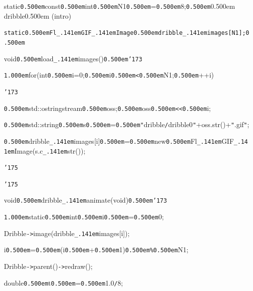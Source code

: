 \documentclass[12pt]{article}
\begin{document}
\noindent
{}static{\tt\mc \kern0.500em}const{\tt\mc \kern0.500em}int{\tt\mc \kern0.500em}N1{\tt\mc \kern0.500em}={\tt\mc \kern0.500em}8;{\tt\mc \kern0.500em}\rm\mc {\tt /}{\tt /}\kern0.500em dribble\kern0.500em (intro)

\noindent
\tt\mc static{\tt\mc \kern0.500em}Fl{\tt\_\kern.141em}GIF{\tt\_\kern.141em}Image{\tt *}{\tt\mc \kern0.500em}dribble{\tt\_\kern.141em}images[N1];{\tt\mc \kern0.500em}

\noindent
{}\hfill

\noindent
{}void{\tt\mc \kern0.500em}load{\tt\_\kern.141em}images(){\tt\mc \kern0.500em}{\tt\char'173}

\noindent
{}{\tt\mc \kern1.000em}for(int{\tt\mc \kern0.500em}i=0;{\tt\mc \kern0.500em}i{\tt\mc \kern0.500em}{\tt <}{\tt\mc \kern0.500em}N1;{\tt\mc \kern0.500em}++i)

\noindent
{}{\tt\char'173}

\noindent
{}{\tt\mc \kern0.500em}std::ostringstream{\tt\mc \kern0.500em}oss;{\tt\mc \kern0.500em}oss{\tt\mc \kern0.500em}{\tt <}{\tt <}{\tt\mc \kern0.500em}i;

\noindent
{}{\tt\mc \kern0.500em}std::string{\tt\mc \kern0.500em}s{\tt\mc \kern0.500em}={\tt\mc \kern0.500em}{\tt "}dribble{\tt /}dribble0{\tt "}+oss.str()+{\tt "}.gif{\tt "};

\noindent
{}{\tt\mc \kern0.500em}dribble{\tt\_\kern.141em}images[i]{\tt\mc \kern0.500em}={\tt\mc \kern0.500em}new{\tt\mc \kern0.500em}Fl{\tt\_\kern.141em}GIF{\tt\_\kern.141em}Image(s.c{\tt\_\kern.141em}str());

\noindent
{}{\tt\char'175}

\noindent
{}{\tt\char'175}

\noindent
{}\hfill

\noindent
{}void{\tt\mc \kern0.500em}dribble{\tt\_\kern.141em}animate(void{\tt *}){\tt\mc \kern0.500em}{\tt\char'173}

\noindent
{}{\tt\mc \kern1.000em}static{\tt\mc \kern0.500em}int{\tt\mc \kern0.500em}i{\tt\mc \kern0.500em}={\tt\mc \kern0.500em}0;

\noindent
{}Dribble{\tt -}{\tt >}image(dribble{\tt\_\kern.141em}images[i]);

\noindent
{}i{\tt\mc \kern0.500em}={\tt\mc \kern0.500em}(i{\tt\mc \kern0.500em}+{\tt\mc \kern0.500em}1){\tt\mc \kern0.500em}{\tt\%}{\tt\mc \kern0.500em}N1;

\noindent
{}Dribble{\tt -}{\tt >}parent(){\tt -}{\tt >}redraw();

\noindent
{}double{\tt\mc \kern0.500em}t{\tt\mc \kern0.500em}={\tt\mc \kern0.500em}1.0{\tt /}8;
\end{document}
